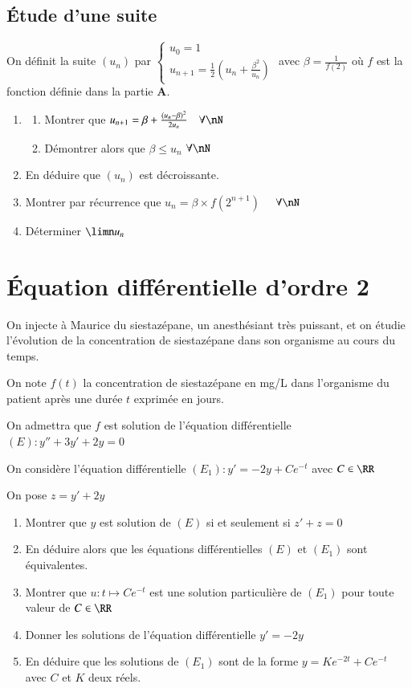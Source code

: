 \documentclass[oneside,12pt]{article}
\let\oldsection\section
\renewcommand{\section}{\newpage\oldsection}
\begin{document}
\subsection{Étude d'une suite}
On définit la suite $(u_n)$ par $\begin{cases}u_0=1\\u_{n+1}=\frac{1}{2}\left(u_n+\frac{\beta^2}{u_n}\right)\end{cases}$ \quad avec $\beta=\frac{1}{f(2)}$ où $f$ est la fonction définie dans la partie \textbf{A}.
\begin{enumerate}
    \item \begin{enumerate}
        \item Montrer que $u_{n+1}=\beta+\frac{(u_n-\beta)^2}{2u_n} \quad \forall\nN$
        \item Démontrer alors que $\beta\leq u_n$ \quad $\forall\nN$
    \end{enumerate}
    \item En déduire que $(u_n)$ est décroissante.
    \item Montrer par récurrence que $u_n=\beta\times f\left(2^{n+1}\right)$ $\quad\forall\nN$
    \item Déterminer $\limn u_n$
\end{enumerate}





\section{Équation différentielle d'ordre 2}

On injecte à Maurice du siestazépane, un anesthésiant très puissant, et on étudie l'évolution de la concentration de siestazépane dans son organisme au cours du temps.

On note $f(t)$ la concentration de siestazépane en mg/L dans l'organisme du patient après une durée $t$ exprimée en jours.

On admettra que $f$ est solution de l'équation différentielle $(E):y''+3y'+2y=0$

On considère l'équation différentielle $(E_1):y'=-2y+Ce^{-t}$ \quad avec $C\in\RR$

On pose $z=y'+2y$

\begin{enumerate}
    \item Montrer que $y$ est solution de $(E)$ si et seulement si $z'+z=0$
    \item En déduire alors que les équations différentielles $(E)$ et $(E_1)$ sont équivalentes.
    \item Montrer que $u:t\mapsto Ce^{-t}$ est une solution particulière de $(E_1)$ pour toute valeur de $C\in\RR$
    \item Donner les solutions de l'équation différentielle $y'=-2y$
    \item En déduire que les solutions de $(E_1)$ sont de la forme $y=Ke^{-2t}+Ce^{-t}$ \quad avec $C$ et $K$ deux réels.
\end{enumerate}
\end{document}
